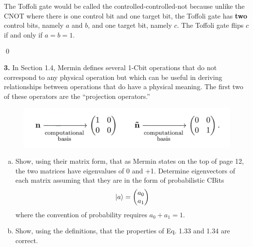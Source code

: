 \documentclass{book}
\theoremstyle{definition}
\begin{document}
\begin{enumerate}[(a)]
	The Toffoli gate would be called the controlled-controlled-not because unlike the CNOT where there is one control bit and one target bit, the Toffoli gate has \textbf{two} control bits, namely $a$ and $b$, and one target bit, namely $c$. The Toffoli gate flips $c$ if and only if $a = b = 1$. 
	
\end{enumerate}


\qed


\newpage
\noindent \textbf{3.} In Section 1.4, Mermin defines several 1-Cbit operations that do not correspond to any physical operation but which can be useful in deriving relationships between operations that do
have a physical meaning. The first two of these operators are the ``projection operators.'' 

\begin{figure}[!htb]
	\centering
	\includegraphics[scale=0.3]{proj}
\end{figure}
\begin{enumerate}[(a)]
	\item Show, using their matrix form, that as Mermin states on the top of page 12, the two
	matrices have eigenvalues of 0 and +1. Determine eigenvectors of each matrix assuming
	that they are in the form of probabilistic CBits
	\begin{align*}
	\ket{a} = \begin{pmatrix}
	a_0 \\ a_1
	\end{pmatrix}
	\end{align*}
	where the convention of probability requires $a_0 + a_1 = 1$. 
	
	\item Show, using the definitions, that the properties of Eq. 1.33 and 1.34 are correct.
	
\end{enumerate}
\end{document}
